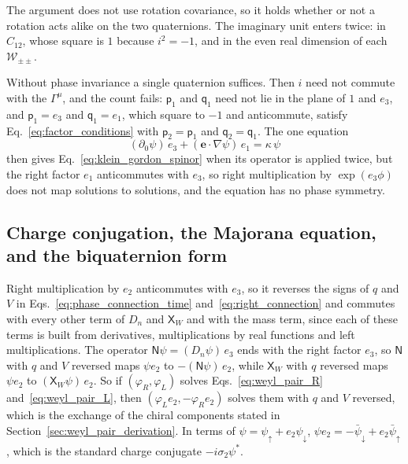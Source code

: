 \documentclass[aps,prd,onecolumn,tightenlines,nofootinbib,notitlepage,11pt,floatfix]{revtex4-2}
\theoremstyle{indentedtheorem}
\begin{document}
The argument does not use rotation covariance, so it holds whether or not a rotation acts alike on the two quaternions. The imaginary unit enters twice: in $C_{12}$, whose square is $1$ because $i^2=-1$, and in the even real dimension of each $\mathcal{W}_{\pm\pm}$.

Without phase invariance a single quaternion suffices. Then $i$ need not commute with the $\Gamma^\mu$, and the count fails: $\mathsf{p}_1$ and $\mathsf{q}_1$ need not lie in the plane of $1$ and $e_3$, and $\mathsf{p}_1=e_3$ and $\mathsf{q}_1=e_1$, which square to $-1$ and anticommute, satisfy Eq.~\eqref{eq:factor_conditions} with $\mathsf{p}_2=\mathsf{p}_1$ and $\mathsf{q}_2=\mathsf{q}_1$. The one equation
\begin{equation}
    (\partial_0\psi) \, e_3 + (\mathbf{e}\cdot\nabla\psi) \, e_1 = \kappa \, \psi
    \label{eq:single_quaternion}
\end{equation}
then gives Eq.~\eqref{eq:klein_gordon_spinor} when its operator is applied twice, but the right factor $e_1$ anticommutes with $e_3$, so right multiplication by $\exp(e_3\phi)$ does not map solutions to solutions, and the equation has no phase symmetry.
\subsection{Charge conjugation, the Majorana equation, and the biquaternion form}
\label{sup:conjugation}

Right multiplication by $e_2$ anticommutes with $e_3$, so it reverses the signs of $q$ and $V$ in Eqs.~\eqref{eq:phase_connection_time} and~\eqref{eq:right_connection} and commutes with every other term of $D_n$ and $\mathsf{X}_W$ and with the mass term, since each of these terms is built from derivatives, multiplications by real functions and left multiplications. The operator $\mathsf{N}\psi=(D_n\psi)\,e_3$ ends with the right factor $e_3$, so $\mathsf{N}$ with $q$ and $V$ reversed maps $\psi e_2$ to $-(\mathsf{N}\psi)\,e_2$, while $\mathsf{X}_W$ with $q$ reversed maps $\psi e_2$ to $(\mathsf{X}_W\psi)\,e_2$. So if $(\varphi_R,\varphi_L)$ solves Eqs.~\eqref{eq:weyl_pair_R} and~\eqref{eq:weyl_pair_L}, then $(\varphi_L e_2,-\varphi_R e_2)$ solves them with $q$ and $V$ reversed, which is the exchange of the chiral components stated in Section~\ref{sec:weyl_pair_derivation}. In terms of $\psi = \psi_\uparrow + e_2\psi_\downarrow$, $\psi e_2 = -\bar{\psi}_\downarrow + e_2\bar{\psi}_\uparrow$, which is the standard charge conjugate $-i\sigma_2\psi^*$.
\end{document}
